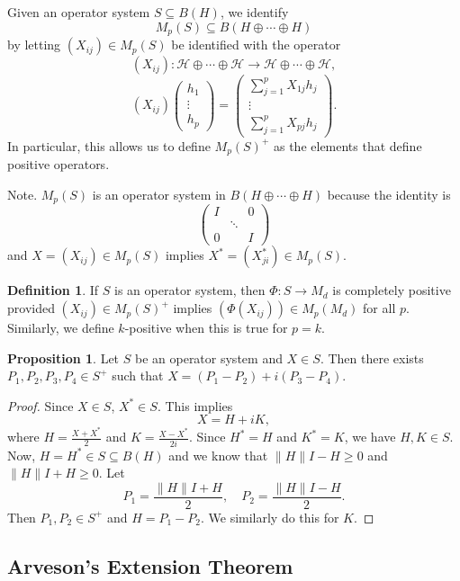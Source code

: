 \documentclass[12pt]{article}
\theoremstyle{definition}
\newtheorem*{proposition}{Proposition}
\newtheorem*{definition}{Definition}
\begin{document}
Given an operator system $S \subseteq B(H)$, we identify
\[
M_p(S) \subseteq B(H \oplus \cdots \oplus H)
\]
by letting $(X_{ij}) \in M_p(S)$ be identified with the operator
\[
(X_{ij}) : \mathcal{H} \oplus \cdots \oplus \mathcal{H} \to \mathcal{H} \oplus \cdots \oplus \mathcal{H},
\]
\[
(X_{ij})\begin{pmatrix}h_1\\ \vdots \\ h_p\end{pmatrix} = \begin{pmatrix}\sum_{j=1}^p X_{1j}h_j\\ \vdots \\ \sum_{j=1}^p X_{pj}h_j\end{pmatrix}.
\]
In particular, this allows us to define $M_p(S)^+$ as the elements that define positive operators.

Note. $M_p(S)$ is an operator system in $B(H \oplus \cdots \oplus H)$ because the identity is
\[
\begin{pmatrix}I & & 0\\ & \ddots & \\ 0 & & I\end{pmatrix}
\]
and $X=(X_{ij}) \in M_p(S)$ implies $X^*=(X_{ji}^*) \in M_p(S)$.

\begin{definition}
If $S$ is an operator system, then $\Phi:S \to M_d$ is completely positive provided $(X_{ij}) \in M_p(S)^+$ implies $(\Phi(X_{ij})) \in M_p(M_d)$ for all $p$. Similarly, we define $k$-positive when this is true for $p=k$.
\end{definition}

\begin{proposition}
Let $S$ be an operator system and $X \in S$. Then there exists $P_1,P_2,P_3,P_4 \in S^+$ such that $X=(P_1-P_2)+i(P_3-P_4)$.
\end{proposition}

\begin{proof}
Since $X \in S$, $X^* \in S$. This implies
\[
X = H+iK,
\]
where $H=\frac{X+X^*}{2}$ and $K=\frac{X-X^*}{2i}$. Since $H^*=H$ and $K^*=K$, we have $H,K \in S$. Now, $H=H^* \in S \subseteq B(H)$ and we know that $\|H\|I-H \geq 0$ and $\|H\|I+H \geq 0$. Let
\[
P_1=\frac{\|H\|I+H}{2}, \quad P_2=\frac{\|H\|I-H}{2}.
\]
Then $P_1,P_2 \in S^+$ and $H=P_1-P_2$. We similarly do this for $K$.
\end{proof}

\subsection{Arveson's Extension Theorem}
\end{document}
